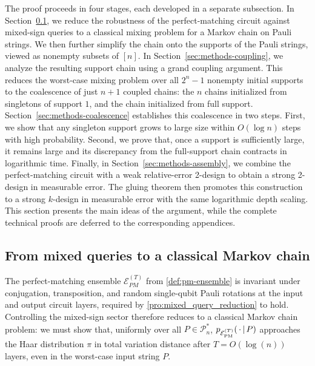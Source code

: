 \documentclass[
    aps,
    superscriptaddress,
    onecolumn,
    10pt,
    prx,
    nofootinbib
]{revtex4-2}
\theoremstyle{namedstatement}
\theoremstyle{plain}
\begin{document}
The proof proceeds in four stages, each developed in a separate subsection.  In Section~\ref{sec:methods-reduction}, we reduce the robustness of the perfect-matching circuit against mixed-sign queries to a classical mixing problem for a Markov chain on Pauli strings. We then further simplify the chain onto the supports of the Pauli strings, viewed as nonempty subsets of $[n]$. In Section~\ref{sec:methods-coupling}, we analyze the resulting support chain using a grand coupling argument. This reduces the worst-case mixing problem over all $2^{n}-1$ nonempty initial supports to the coalescence of just $n+1$ coupled chains: the $n$ chains initialized from singletons of support $1$, and the chain initialized from full support. Section~\ref{sec:methods-coalescence} establishes this coalescence in two steps. First, we show that any singleton support grows to large size within $O(\log{n})$ steps with high probability. Second, we prove that, once a support is sufficiently large, it remains large and its discrepancy from the full-support chain contracts in logarithmic time. Finally, in Section~\ref{sec:methods-assembly}, we combine the perfect-matching circuit with a weak relative-error 2-design to obtain a strong 2-design in measurable error.
The gluing theorem then promotes this construction to a strong $k$-design in measurable error with the same logarithmic depth scaling. This section presents the main ideas of the argument, while the complete technical proofs are deferred to the corresponding appendices.
\subsection{From mixed queries to a classical Markov chain}
\label{sec:methods-reduction}


The perfect-matching ensemble $\mathcal{E}_{PM}^{(T)}$ from \cref{def:pm-ensemble} is invariant under conjugation, transposition, and random single-qubit Pauli rotations at the input and output circuit layers, required by \cref{pro:mixed_query_reduction} to hold. Controlling the mixed-sign sector therefore reduces to a classical Markov chain problem: we must show that, uniformly over all $P\in \mathcal{P}_n^*$, $p_{\mathcal{E}_{\rm PM}^{(T)}}(\,\cdot\,|\,P)$ approaches the Haar distribution $\pi$ in total variation distance after $T=O(\log(n))$ layers, even in the worst-case input string $P$.
\end{document}

